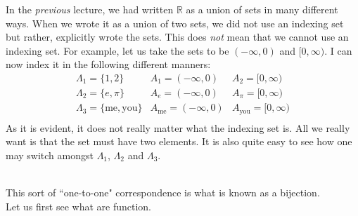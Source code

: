 In the \textit{previous} lecture, we had written $\mathbb{R}$ as a union of sets in many different ways. When we wrote it as a union of two sets, we did not use an indexing set but rather, explicitly wrote the sets. This does \textit{not} mean that we cannot use an indexing set. For example, let us take the sets to be $(-\infty, 0)$ and $[0, \infty)$. I can now index it in the following different manners:\\
\[\begin{array}{lll}
    \Lambda_1 = \{1, 2\} & A_1 = (-\infty, 0) & A_2 = [0, \infty)\\
    \Lambda_2 = \{e, \pi\} & A_e = (-\infty, 0) & A_\pi = [0, \infty)\\
    \Lambda_3 = \{\text{me}, \text{you}\} & A_\text{me} = (-\infty, 0) & A_\text{you} = [0, \infty)\\ 
\end{array}\]
As it is evident, it does not really matter what the indexing set is. All we really want is that the set must have two elements. It is also quite easy to see how one may switch amongst $\Lambda_1$, $\Lambda_2$ and $\Lambda_3$.\\
\\
This sort of ``one-to-one" correspondence is what is known as a bijection.\\
Let us first see what are function.
